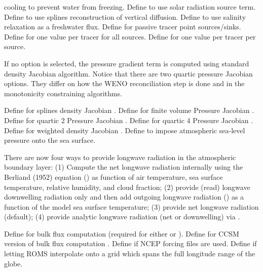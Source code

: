 \begin{klist}
\begin{klist}
  cooling to prevent water from freezing.
      Define to use solar radiation source term.
      Define to use splines reconstruction of
  vertical diffusion.
      Define to use salinity relaxation as a
  freshwater flux.
      Define for passive tracer point sources/sinks.
      Define for one value per tracer for
  all sources.
      Define for one value per tracer
  per source.
  \end{klist}
   \mbox{}
If no option is selected, the pressure gradient term is computed using
standard density Jacobian algorithm. Notice that there are two
quartic pressure Jacobian options. They differ on how the WENO
reconciliation
step is done and in the monotonicity constraining algorithms.
  \begin{klist}
      Define for splines density Jacobian
  \citep{SS2003}.
      Define for finite volume Pressure Jacobian
  \citep{Lin97}.
      Define for quartic 2 Pressure Jacobian
  \citep{SS2003}.
      Define for quartic 4 Pressure Jacobian
  \citep{SS2003}.
      Define for weighted density Jacobian
  \citep{Song98}.
      Define to impose atmospheric sea-level pressure
  onto the sea surface.
  \end{klist}
   There are now four ways to provide longwave radiation in the atmospheric
 boundary layer: (1) Compute the net longwave radiation internally
 using the Berliand (1952) equation () as function of
 air temperature, sea surface temperature, relative humidity, and cloud
 fraction; (2) provide (read) longwave downwelling radiation only  and
 then add outgoing longwave radiation () as a function
 of the model sea surface temperature; (3) provide net longwave radiation
 (default); (4) provide analytic longwave radiation (net or
 downwelling) via .
  \begin{klist}
     Define for bulk flux computation (required
    for either \citet{Fairall_2003} or \citet{Large_08}).
     Define for CCSM version of bulk flux
    computation \citep{Large_08}.
     Define if NCEP forcing files are used.
     Define if letting ROMS interpolate
  onto a grid which spans the full longitude range of the globe.

\end{klist}
\end{klist}
